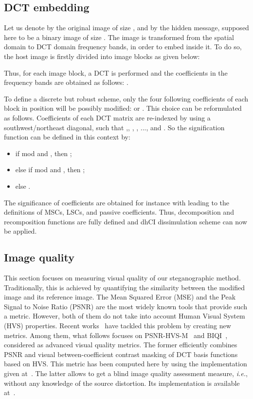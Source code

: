 \documentclass{comjnl}
\begin{document}
\subsection{DCT embedding}
Let us denote by  the original image of size , and by 
the hidden message, supposed here to be a binary image of size . The image  is transformed from the spatial
domain to DCT domain frequency bands,
in order to embed  inside it.  
To do so, the host image is firstly divided into 
image blocks as given below:

Thus, for each image block,
a DCT is performed and the coefficients in the frequency bands 
are obtained as follows:
.

To define a discrete but robust scheme, only the four following coefficients of each  block in position  will be possibly modified:   or . 
This choice can be reformulated as follows. 
Coefficients of each DCT matrix are re-indexed by using a southwest/northeast diagonal, such that ,\linebreak , , , ..., and   .
So the signification function can be defined in this context by:
\begin{itemize}
\item if  mod  and , then ;
\item else if  mod  and , then ;
\item else .
\end{itemize}
The significance of coefficients are obtained for instance with 
 leading to the definitions of MSCs, LSCs, and passive coefficients.
Thus, decomposition and recomposition functions are fully defined and dhCI dissimulation scheme can now be applied.




\subsection{Image quality}
This section focuses on measuring visual quality of our steganographic method.
Traditionally, this is achieved by quantifying the similarity 
between the modified image and its reference image.
The Mean Squared Error (MSE) and the Peak Signal to Noise
Ratio (PSNR) are the most widely known tools that provide such a metric.
However, both of them do not take into account Human Visual System (HVS)
properties. 
Recent works~\cite{EAPLBC06,SheikhB06,PSECAL07,MB10} have tackled this problem 
by creating new metrics. Among them, what follows focuses on PSNR-HVS-M~\cite{PSECAL07} and BIQI~\cite{MB10}, considered as advanced visual quality metrics.  
The former efficiently combines PSNR and  visual between-coefficient contrast masking of DCT basis functions based on HVS. This metric has 
been computed here by using the implementation given at~\cite{psnrhvsm11}.
The latter allows to get a blind image quality assessment measure, 
\textit{i.e.}, without any knowledge of the source distortion.
Its implementation is available at~\cite{biqi11}.
\end{document}

